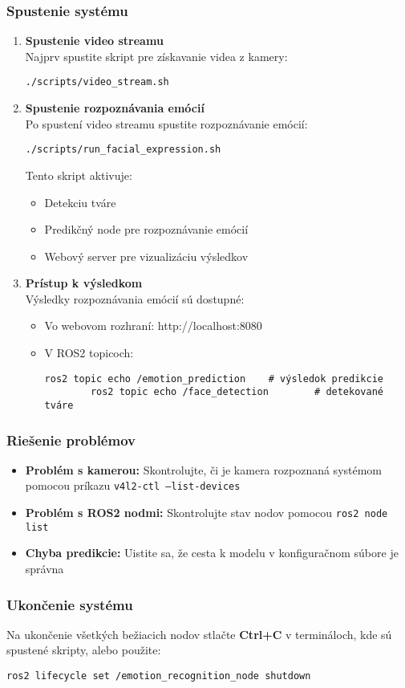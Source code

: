 \subsubsection{Spustenie systému}
\begin{enumerate}
    \item \textbf{Spustenie video streamu}\\
    Najprv spustite skript pre získavanie videa z kamery:
    \begin{lstlisting}[basicstyle=\ttfamily\small]
    ./scripts/video_stream.sh
    \end{lstlisting}
    
    \item \textbf{Spustenie rozpoznávania emócií}\\
    Po spustení video streamu spustite rozpoznávanie emócií:
    \begin{lstlisting}[basicstyle=\ttfamily\small]
    ./scripts/run_facial_expression.sh
    \end{lstlisting}
    Tento skript aktivuje:
    \begin{itemize}
        \item Detekciu tváre
        \item Predikčný node pre rozpoznávanie emócií
        \item Webový server pre vizualizáciu výsledkov
    \end{itemize}
    
    \item \textbf{Prístup k výsledkom}\\
    Výsledky rozpoznávania emócií sú dostupné:
    \begin{itemize}
        \item Vo webovom rozhraní: http://localhost:8080
        \item V ROS2 topicoch:
        \begin{lstlisting}[basicstyle=\ttfamily\small]
        ros2 topic echo /emotion_prediction    # výsledok predikcie
        ros2 topic echo /face_detection        # detekované tváre
        \end{lstlisting}
    \end{itemize}
\end{enumerate}

\subsubsection{Riešenie problémov}
\begin{itemize}
    \item \textbf{Problém s kamerou:} Skontrolujte, či je kamera rozpoznaná systémom pomocou príkazu \texttt{v4l2-ctl --list-devices}
    \item \textbf{Problém s ROS2 nodmi:} Skontrolujte stav nodov pomocou \texttt{ros2 node list}
    \item \textbf{Chyba predikcie:} Uistite sa, že cesta k modelu v konfiguračnom súbore je správna
\end{itemize}

\subsubsection{Ukončenie systému}
Na ukončenie všetkých bežiacich nodov stlačte \textbf{Ctrl+C} v termináloch, kde sú spustené skripty, alebo použite:
\begin{lstlisting}[basicstyle=\ttfamily\small]
ros2 lifecycle set /emotion_recognition_node shutdown
\end{lstlisting}